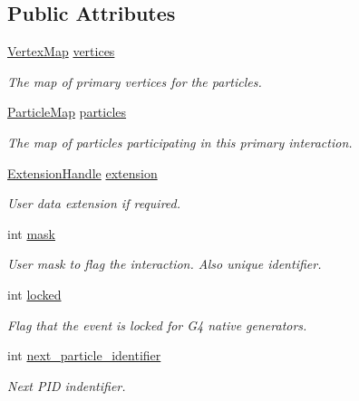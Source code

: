 \subsection*{Public Attributes}
\begin{DoxyCompactItemize}
\item 
\hyperlink{class_d_d4hep_1_1_simulation_1_1_geant4_primary_interaction_a0016a8298291af16ea8f24a054cb864c}{VertexMap} \hyperlink{class_d_d4hep_1_1_simulation_1_1_geant4_primary_interaction_aea4d776147c0e3d0503ee03de54932af}{vertices}
\begin{DoxyCompactList}\small\item\em The map of primary vertices for the particles. \item\end{DoxyCompactList}\item 
\hyperlink{class_d_d4hep_1_1_simulation_1_1_geant4_primary_interaction_a6787a2c42dc1fd371b274e75dc380e92}{ParticleMap} \hyperlink{class_d_d4hep_1_1_simulation_1_1_geant4_primary_interaction_af8c7d724dc7792108c26c6fe93d7bf61}{particles}
\begin{DoxyCompactList}\small\item\em The map of particles participating in this primary interaction. \item\end{DoxyCompactList}\item 
\hyperlink{class_d_d4hep_1_1dd4hep__ptr}{ExtensionHandle} \hyperlink{class_d_d4hep_1_1_simulation_1_1_geant4_primary_interaction_a5b906f3249844ff63ea285eb633003d8}{extension}
\begin{DoxyCompactList}\small\item\em User data extension if required. \item\end{DoxyCompactList}\item 
int \hyperlink{class_d_d4hep_1_1_simulation_1_1_geant4_primary_interaction_a0b4d8c22740846c3d812a13c1048b594}{mask}
\begin{DoxyCompactList}\small\item\em User mask to flag the interaction. Also unique identifier. \item\end{DoxyCompactList}\item 
int \hyperlink{class_d_d4hep_1_1_simulation_1_1_geant4_primary_interaction_a29b9944b1c56dbbc422320f6bc5a3a85}{locked}
\begin{DoxyCompactList}\small\item\em Flag that the event is locked for G4 native generators. \item\end{DoxyCompactList}\item 
int \hyperlink{class_d_d4hep_1_1_simulation_1_1_geant4_primary_interaction_a75a39b787b9c354fd958569f316a3023}{next\_\-particle\_\-identifier}
\begin{DoxyCompactList}\small\item\em Next PID indentifier. \item\end{DoxyCompactList}\end{DoxyCompactItemize}
